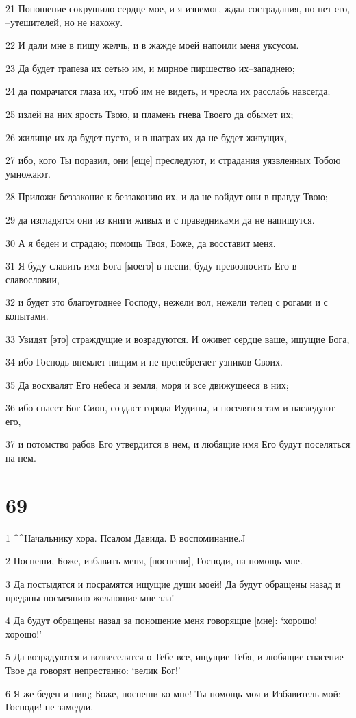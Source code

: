 \par 21 Поношение сокрушило сердце мое, и я изнемог, ждал сострадания, но нет его, --утешителей, но не нахожу.
\par 22 И дали мне в пищу желчь, и в жажде моей напоили меня уксусом.
\par 23 Да будет трапеза их сетью им, и мирное пиршество их--западнею;
\par 24 да помрачатся глаза их, чтоб им не видеть, и чресла их расслабь навсегда;
\par 25 излей на них ярость Твою, и пламень гнева Твоего да обымет их;
\par 26 жилище их да будет пусто, и в шатрах их да не будет живущих,
\par 27 ибо, кого Ты поразил, они [еще] преследуют, и страдания уязвленных Тобою умножают.
\par 28 Приложи беззаконие к беззаконию их, и да не войдут они в правду Твою;
\par 29 да изгладятся они из книги живых и с праведниками да не напишутся.
\par 30 А я беден и страдаю; помощь Твоя, Боже, да восставит меня.
\par 31 Я буду славить имя Бога [моего] в песни, буду превозносить Его в славословии,
\par 32 и будет это благоугоднее Господу, нежели вол, нежели телец с рогами и с копытами.
\par 33 Увидят [это] страждущие и возрадуются. И оживет сердце ваше, ищущие Бога,
\par 34 ибо Господь внемлет нищим и не пренебрегает узников Своих.
\par 35 Да восхвалят Его небеса и земля, моря и все движущееся в них;
\par 36 ибо спасет Бог Сион, создаст города Иудины, и поселятся там и наследуют его,
\par 37 и потомство рабов Его утвердится в нем, и любящие имя Его будут поселяться на нем.

\chapter{69}

\par 1 ^^Начальнику хора. Псалом Давида. В воспоминание.^^
\par 2 Поспеши, Боже, избавить меня, [поспеши], Господи, на помощь мне.
\par 3 Да постыдятся и посрамятся ищущие души моей! Да будут обращены назад и преданы посмеянию желающие мне зла!
\par 4 Да будут обращены назад за поношение меня говорящие [мне]: `хорошо! хорошо!'
\par 5 Да возрадуются и возвеселятся о Тебе все, ищущие Тебя, и любящие спасение Твое да говорят непрестанно: `велик Бог!'
\par 6 Я же беден и нищ; Боже, поспеши ко мне! Ты помощь моя и Избавитель мой; Господи! не замедли.

